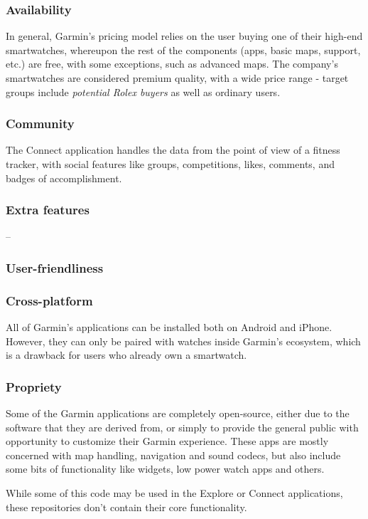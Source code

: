 \subsubsection*{Availability}
In general, Garmin's pricing model relies on the user buying one of their high-end smartwatches, whereupon the rest of the components (apps, basic maps, support, etc.) are free, with some exceptions, such as advanced maps. 
The company's smartwatches are considered premium quality, with a wide price range - target groups include \textit{potential Rolex buyers}\cite{garmin-expensive} as well as ordinary users.\cite{garmin-watches-review}
\subsubsection*{Community}
The Connect application handles the data from the point of view of a fitness tracker, with social features like groups, competitions, likes, comments, and badges of accomplishment.\cite{garmin-connect}
\subsubsection*{Extra features} -- 
\subsubsection*{User-friendliness}

\subsubsection*{Cross-platform}
All of Garmin's applications can be installed both on Android and iPhone.
However, they can only be paired with watches inside Garmin's ecosystem, which is a drawback for users who already own a smartwatch.
\subsubsection*{Propriety}
Some of the Garmin applications are completely open-source, either due to the software that they are derived from, or simply to provide the general public with opportunity to customize their Garmin experience.\cite{garmin-open-source}\cite{garmin-connect-github-repos}
These apps are mostly concerned with map handling, navigation and sound codecs, but also include some bits of functionality like widgets, low power watch apps and others.

While some of this code may be used in the Explore or Connect applications, these repositories don't contain their core functionality.

